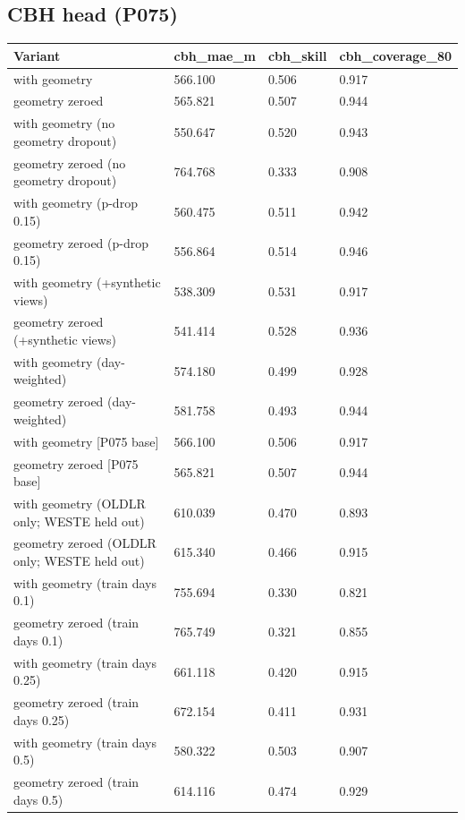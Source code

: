 \subsection{CBH head (P075)}

\begin{center}{\scriptsize\setlength{\tabcolsep}{3pt}
\begin{tabular}{p{12.7cm}lll}
\toprule
Variant & cbh\_mae\_m & cbh\_skill & cbh\_coverage\_80 \\
\midrule
with geometry & 566.100 & 0.506 & 0.917 \\
geometry zeroed & 565.821 & 0.507 & 0.944 \\
with geometry (no geometry dropout) & 550.647 & 0.520 & 0.943 \\
geometry zeroed (no geometry dropout) & 764.768 & 0.333 & 0.908 \\
with geometry (p-drop 0.15) & 560.475 & 0.511 & 0.942 \\
geometry zeroed (p-drop 0.15) & 556.864 & 0.514 & 0.946 \\
with geometry (+synthetic views) & 538.309 & 0.531 & 0.917 \\
geometry zeroed (+synthetic views) & 541.414 & 0.528 & 0.936 \\
with geometry (day-weighted) & 574.180 & 0.499 & 0.928 \\
geometry zeroed (day-weighted) & 581.758 & 0.493 & 0.944 \\
with geometry [P075 base] & 566.100 & 0.506 & 0.917 \\
geometry zeroed [P075 base] & 565.821 & 0.507 & 0.944 \\
with geometry (OLDLR only; WESTE held out) & 610.039 & 0.470 & 0.893 \\
geometry zeroed (OLDLR only; WESTE held out) & 615.340 & 0.466 & 0.915 \\
with geometry (train days 0.1) & 755.694 & 0.330 & 0.821 \\
geometry zeroed (train days 0.1) & 765.749 & 0.321 & 0.855 \\
with geometry (train days 0.25) & 661.118 & 0.420 & 0.915 \\
geometry zeroed (train days 0.25) & 672.154 & 0.411 & 0.931 \\
with geometry (train days 0.5) & 580.322 & 0.503 & 0.907 \\
geometry zeroed (train days 0.5) & 614.116 & 0.474 & 0.929 \\
\bottomrule
\end{tabular}}
\end{center}

